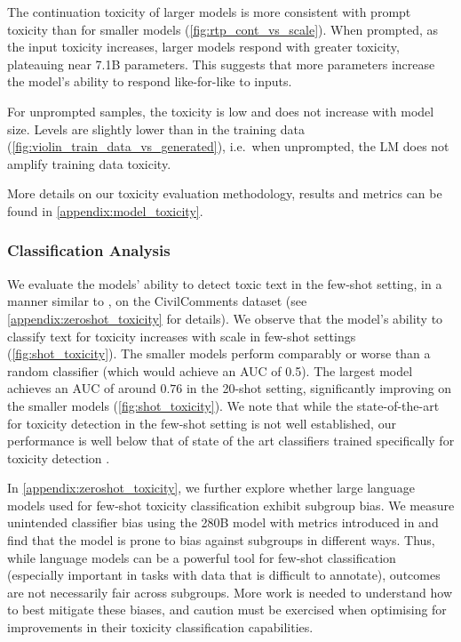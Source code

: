 The continuation toxicity of larger models is more consistent with prompt toxicity than for smaller models (\autoref{fig:rtp_cont_vs_scale}). 
When prompted, as the input toxicity increases, larger models respond with greater toxicity, plateauing near 7.1B parameters. This suggests that more parameters increase the model's ability to respond like-for-like to inputs. 

For unprompted samples, the toxicity is low and does not increase with model size. Levels are slightly lower than in the training data (\autoref{fig:violin_train_data_vs_generated}), i.e.~when unprompted, the LM does not amplify training data toxicity.

More details on our toxicity evaluation methodology, results and metrics can be found in \autoref{appendix:model_toxicity}.

\subsubsection{Classification Analysis}
\label{sec:toxicity}
We evaluate the models' ability to detect toxic text in the few-shot setting, in a manner similar to \cite{selfdiagnosis}, on the CivilComments dataset \citep{nuanced_metrics} (see  \autoref{appendix:zeroshot_toxicity} for details). We observe that the model's ability to classify text for toxicity increases with scale in few-shot settings (\autoref{fig:shot_toxicity}).
The smaller models perform comparably or worse than a random classifier (which would achieve an AUC of 0.5). The largest model achieves an AUC of around $0.76$ in the 20-shot setting, significantly improving on the smaller models (\autoref{fig:shot_toxicity}). 
We note that while the state-of-the-art for toxicity detection in the few-shot setting is not well established, our performance is well below that of state of the art classifiers trained specifically for toxicity detection \citep{nuanced_metrics}.

In \autoref{appendix:zeroshot_toxicity}, 
we further explore whether large language models used for few-shot toxicity classification exhibit subgroup bias. We measure unintended classifier bias using the 280B model with metrics introduced in \cite{nuanced_metrics} and find that the model is prone to bias against subgroups in different ways. Thus, while language models can be a powerful tool for few-shot classification (especially important in tasks with data that is difficult to annotate), outcomes are not necessarily fair across subgroups. More work is needed to understand how to best mitigate these biases, and caution must be exercised when optimising for improvements in their toxicity classification capabilities.

